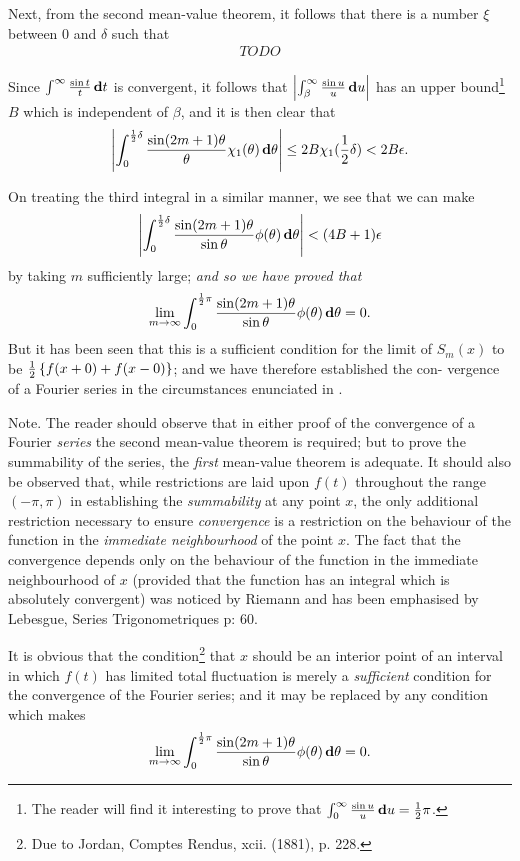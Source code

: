 Next, from the second mean-value theorem, it follows that there is a
number $\xi$ between $0$ and $\delta$ such that
\begin{align*}
TODO
\end{align*}

Since
$\int^{\infty} \frac{\sin t}{t} \, \mathbf{d} t$
is convergent, it follows that
$\left| \int_{\beta}^{\infty} \frac{\sin u}{u} \, \mathbf{d} u \right|$
has an upper bound\footnote{The reader will find it interesting to prove that
  $\int_{0}^{\infty} \frac{\sin u}{u} \, \mathbf{d} u = \frac{1}{2}\pi$.}
$B$ which is independent of $\beta$, and it is then clear that
$$
\left| 
  \int_{0}^{\frac{1}{2}\delta}
  \frac{\sin (2m+1)\theta}{\theta}
  \chi_{1}(\theta)
  \, \mathbf{d} \theta
 \right|
\leq
2 B \chi_{1}(\frac{1}{2}\delta)
<
2 B \epsilon.
$$

On treating the third integral in a similar manner, we see that we can
make
$$
\left| 
  \int_{0}^{\frac{1}{2}\delta}
  \frac{\sin (2m+1)\theta}{\sin \theta}
  \phi(\theta)
  \, \mathbf{d} \theta
 \right|
<
(4B+1) \epsilon
$$
by taking $m$ sufficiently large; \emph{and so we have proved that}
$$
\lim_{m \rightarrow \infty}
\int_{0}^{\frac{1}{2}\pi}
\frac{\sin (2m+1)\theta}{\sin \theta}
\phi(\theta)
\, \mathbf{d} \theta
=
0.
$$
But it has been seen that this is a sufficient condition for the limit
of $S_{m}(x)$ to be $\frac{1}{2} \left\{ f(x+0) + f(x-0) \right\}$; and we have therefore
established the con- vergence of a Fourier series in the circumstances
enunciated in .

Note. The reader should observe that in either proof of the
convergence of a Fourier \emph{series} the second mean-value theorem is
required; but to prove the summability of the series, the \emph{first}
mean-value theorem is adequate. It should also be observed that, while
restrictions are laid upon $f(t)$ throughout the range $(-\pi, \pi)$ in
establishing the \emph{summability} at any point $x$, the only additional
restriction necessary to ensure \emph{convergence} is a restriction on the
behaviour of the function in the \emph{immediate neighbourhood} of the point
$x$. The fact that the convergence depends only on the behaviour of the
function in the immediate neighbourhood of $x$ (provided that the
function has an integral which is absolutely convergent) was noticed
by Riemann and has been emphasised by Lebesgue,
Series Trigonometriques p: 60.

It is obvious that the condition\footnote{Due to Jordan, Comptes Rendus, xcii. (1881), p. 228.}
that $x$ should be an interior point
of an interval in which $f(t)$ has limited total fluctuation is merely a
\emph{sufficient} condition for the convergence of the Fourier series; and
it may be replaced by any condition which makes
$$
\lim_{m \rightarrow \infty}
\int_{0}^{\frac{1}{2}\pi}
\frac{\sin (2m+1)\theta}{\sin \theta}
\phi(\theta)
\, \mathbf{d} \theta
=
0.
$$
%
%


